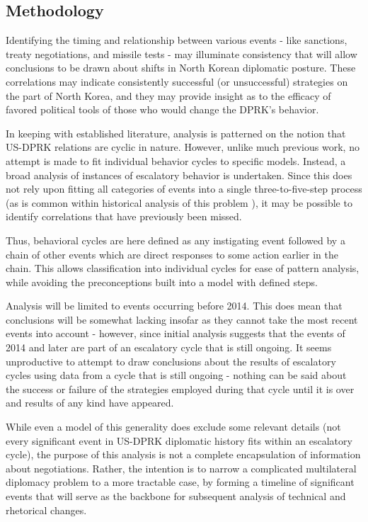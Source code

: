 \documentclass{article}
\begin{document}
\subsection{Methodology}

Identifying the timing and relationship between various events - like sanctions, treaty negotiations, and missile tests - may illuminate consistency that will allow conclusions to be drawn about shifts in North Korean diplomatic posture. These correlations may indicate consistently successful (or unsuccessful) strategies on the part of North Korea, and they may provide insight as to the efficacy of favored political tools of those who would change the DPRK's behavior.

In keeping with established literature, analysis is patterned on the notion that US-DPRK relations are cyclic in nature. However, unlike much previous work, no attempt is made to fit individual behavior cycles to specific models. Instead, a broad analysis of instances of escalatory behavior is undertaken. Since this does not rely upon fitting all categories of events into a single three-to-five-step process (as is common within historical analysis of this problem \cite{fisher, jun}), it may be possible to identify correlations that have previously been missed.

Thus, behavioral cycles are here defined as any instigating event followed by a chain of other events which are direct responses to some action earlier in the chain. This allows classification into individual cycles for ease of pattern analysis, while avoiding the preconceptions built into a model with defined steps.

Analysis will be limited to events occurring before 2014. This does mean that conclusions will be somewhat lacking insofar as they cannot take the most recent events into account - however, since initial analysis suggests that the events of 2014 and later are part of an escalatory cycle that is still ongoing. It seems unproductive to attempt to draw conclusions about the results of escalatory cycles using data from a cycle that is still ongoing - nothing can be said about the success or failure of the strategies employed during that cycle until it is over and results of any kind have appeared.

While even a model of this generality does exclude some relevant details (not every significant event in US-DPRK diplomatic history fits within an escalatory cycle), the purpose of this analysis is not a complete encapsulation of information about negotiations. Rather, the intention is to narrow a complicated multilateral diplomacy problem to a more tractable case, by forming a timeline of significant events that will serve as the backbone for subsequent analysis of technical and rhetorical changes.
\end{document}
